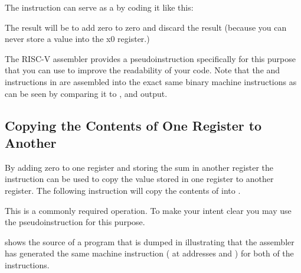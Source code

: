 The  instruction can serve as a  by coding it like this:


The result will be to add zero to zero and discard the result (because you
can never store a value into the x0 register.)

The RISC-V assembler provides a pseudoinstruction specifically for this 
purpose that you can use to improve the readability of your code.  Note 
that the  and  instructions in 
are assembled into the exact same binary machine instructions
as can be seen by comparing it to 
\verb@objdump@ {}, 
and \verb@rvddt@ {} output.






\subsection{Copying the Contents of One Register to Another}

By adding zero to one register and storing the sum in another register
the  instruction can be used to copy the value stored in one
register to another register.  The following instruction will copy
the contents of  into .


This is a commonly required operation.  To make your intent clear
you may use the  pseudoinstruction for this purpose.  

 shows the source of a program that is dumped in 
 illustrating that the assembler has generated the
same machine instruction ( at addresses  and ) 
for both of the instructions.

